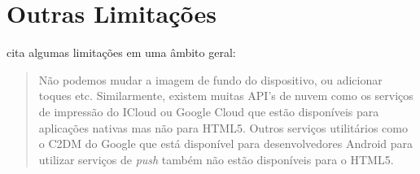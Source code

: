 \section{Outras Limitações}


\cite{html5Tradeoffs} cita algumas limitações em uma âmbito geral:
\begin{quote}
Não podemos mudar a imagem de fundo do dispositivo, ou adicionar toques
etc. Similarmente, existem muitas API's de nuvem como os serviços
de impressão do ICloud ou Google Cloud que estão disponíveis para
aplicações nativas mas não para HTML5. Outros serviços utilitários
como o C2DM do Google que está disponível para desenvolvedores Android
para utilizar serviços de \textit{push} também não estão disponíveis
para o HTML5.
\end{quote}

